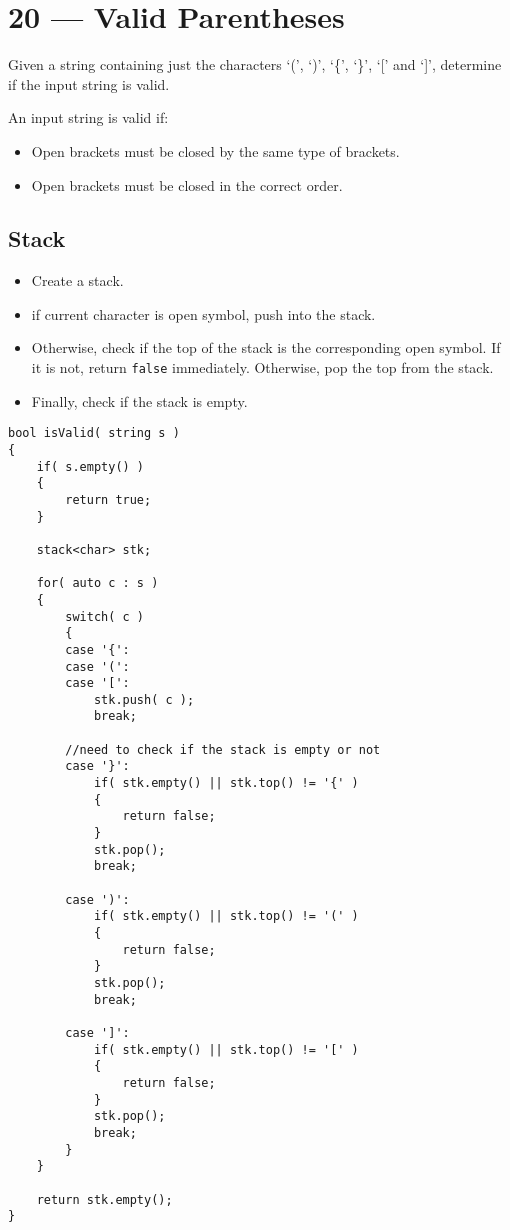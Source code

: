 \section{20 --- Valid Parentheses}
Given a string containing just the characters `(', `)', `\{', `\}', `[' and `]', determine if the input string is valid.
\par
An input string is valid if:
\begin{itemize}
\item Open brackets must be closed by the same type of brackets.
\item Open brackets must be closed in the correct order.
\end{itemize}
\subsection{Stack}
\begin{itemize}
\item Create a stack.
\item if current character is open symbol, push into the stack.
\item Otherwise, check if the top of the stack is the corresponding open symbol. If it is not, return \texttt{false} immediately. Otherwise, pop the top from the stack.
\item Finally, check if the stack is empty.
\end{itemize}
\setcounter{lstlisting}{0}
\begin{lstlisting}[style=customc, caption={Stack}]
bool isValid( string s )
{
    if( s.empty() )
    {
        return true;
    }

    stack<char> stk;

    for( auto c : s )
    {
        switch( c )
        {
        case '{':
        case '(':
        case '[':
            stk.push( c );
            break;

        //need to check if the stack is empty or not
        case '}':
            if( stk.empty() || stk.top() != '{' )
            {
                return false;
            }
            stk.pop();
            break;

        case ')':
            if( stk.empty() || stk.top() != '(' )
            {
                return false;
            }
            stk.pop();
            break;

        case ']':
            if( stk.empty() || stk.top() != '[' )
            {
                return false;
            }
            stk.pop();
            break;
        }
    }

    return stk.empty();
}
\end{lstlisting}
